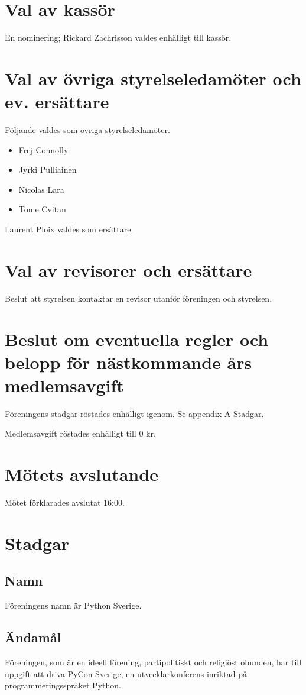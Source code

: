 \documentclass[11pt, a4paper]{article}
\begin{document}
\section{Val av kassör}
En nominering; Rickard Zachrisson valdes enhälligt till kassör.

\section{Val av övriga styrelseledamöter och ev. ersättare}
Följande valdes som övriga styrelseledamöter.

\begin{itemize}
    \item Frej Connolly
    \item Jyrki Pulliainen
    \item Nicolas Lara
    \item Tome Cvitan
\end{itemize}
Laurent Ploix valdes som ersättare.

\section{Val av revisorer och ersättare}
Beslut att styrelsen kontaktar en revisor utanför föreningen och styrelsen.

\section{Beslut om eventuella regler och belopp för nästkommande års medlemsavgift}
Föreningens stadgar röstades enhälligt igenom. Se appendix A Stadgar.

Medlemsavgift röstades enhälligt till 0 kr.

\section{Mötets avslutande}
Mötet förklarades avslutat 16:00.

\newpage
\appendix
\section{Stadgar}
\subsection{Namn}
Föreningens namn är Python Sverige.

\subsection{Ändamål}
Föreningen, som är en ideell förening, partipolitiskt och religiöst obunden, har till uppgift att driva PyCon Sverige, en utvecklarkonferens inriktad på programmeringsspråket Python.
\end{document}
